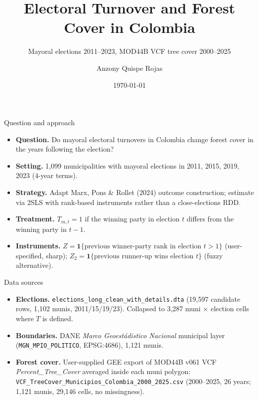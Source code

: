 \documentclass[10pt,aspectratio=169]{beamer}
\title{Electoral Turnover and Forest Cover in Colombia}
\subtitle{Mayoral elections 2011--2023, MOD44B VCF tree cover 2000--2025}
\author{Anzony Quispe Rojas}
\date{\today}
\begin{document}
\begin{frame}\titlepage\end{frame}

\begin{frame}{Question and approach}
\begin{itemize}
  \item \textbf{Question.} Do mayoral electoral turnovers in Colombia change
        forest cover in the years following the election?
  \item \textbf{Setting.} 1{,}099 municipalities with mayoral elections in
        2011, 2015, 2019, 2023 (4-year terms).
  \item \textbf{Strategy.} Adapt Marx, Pons \& Rollet (2024) outcome
        construction; estimate via 2SLS with rank-based instruments rather
        than a close-elections RDD.
  \item \textbf{Treatment.} $T_{m,t}=1$ if the winning party in election
        $t$ differs from the winning party in $t-1$.
  \item \textbf{Instruments.}
      $Z = \mathbf{1}\{\text{previous winner-party rank in election } t > 1\}$ (user-specified, sharp);
      $Z_2 = \mathbf{1}\{\text{previous runner-up wins election } t\}$ (fuzzy alternative).
\end{itemize}
\end{frame}


\begin{frame}{Data sources}
\begin{itemize}
  \item \textbf{Elections.} \texttt{elections\_long\_clean\_with\_details.dta}
        (19{,}597 candidate rows, 1{,}102 munis, 2011/15/19/23). Collapsed
        to 3,287 muni $\times$ election cells where $T$ is defined.
  \item \textbf{Boundaries.} DANE \emph{Marco Geoest{\'a}distico Nacional}
        municipal layer (\texttt{MGN\_MPIO\_POLITICO}, EPSG:4686), 1{,}121 munis.
  \item \textbf{Forest cover.} User-supplied GEE export of MOD44B v061 VCF
        \emph{Percent\_Tree\_Cover} averaged inside each muni polygon:
        \texttt{VCF\_TreeCover\_Municipios\_Colombia\_2000\_2025.csv}
        (2000--2025, 26 years; 1{,}121 munis, 29{,}146 cells, no missingness).
\end{itemize}
\end{frame}
\end{document}
